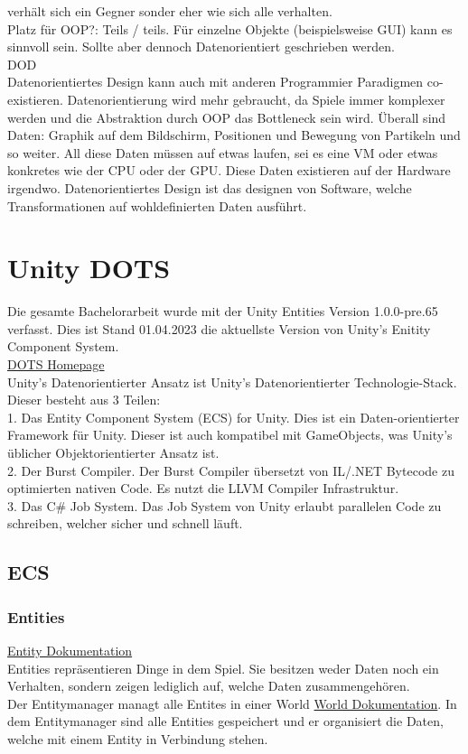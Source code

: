 \documentclass[12pt, titlepage]{article}
\begin{document}
verhält sich ein Gegner sonder eher wie sich alle verhalten.\\Platz für OOP?: Teils / teils. Für einzelne Objekte (beispielsweise GUI) kann es sinnvoll sein. Sollte aber dennoch Datenorientiert geschrieben werden.
\\ DOD \cite{DOD}\\
Datenorientiertes Design kann auch mit anderen Programmier Paradigmen co-existieren. Datenorientierung wird mehr gebraucht, da Spiele immer komplexer werden und die Abstraktion durch OOP das Bottleneck sein wird. Überall sind Daten: Graphik auf dem Bildschirm, Positionen und Bewegung von Partikeln und so weiter. All diese Daten müssen auf etwas laufen, sei es eine VM oder etwas konkretes wie der CPU oder der GPU. Diese Daten existieren auf der Hardware irgendwo. Datenorientiertes Design ist das designen von Software, welche Transformationen auf wohldefinierten Daten ausführt. 
\newpage
\section{Unity DOTS}
Die gesamte Bachelorarbeit wurde mit der Unity Entities Version 1.0.0-pre.65 verfasst. Dies ist Stand 01.04.2023 die aktuellste Version von Unity's Enitity Component System.\\
\href{https://unity.com/de/dots}{DOTS Homepage} \\
Unity's Datenorientierter Ansatz ist Unity's Datenorientierter Technologie-Stack. Dieser besteht aus 3 Teilen:\\
1. Das Entity Component System (ECS) for Unity. Dies ist ein Daten-orientierter Framework für Unity. Dieser ist auch kompatibel mit GameObjects, was Unity's üblicher Objektorientierter Ansatz ist.\\2. Der Burst Compiler. Der Burst Compiler übersetzt von IL/.NET Bytecode zu optimierten nativen Code. Es nutzt die LLVM Compiler Infrastruktur.\\3. Das C\# Job System. Das Job System von Unity erlaubt parallelen Code zu schreiben, welcher sicher und schnell läuft.
\subsection{ECS}
\subsubsection{Entities}
\href{https://docs.unity3d.com/Packages/com.unity.entities@1.0/manual/concepts-entities.html}{Entity Dokumentation}\\Entities repräsentieren Dinge in dem Spiel. Sie besitzen weder Daten noch ein Verhalten, sondern zeigen lediglich auf, welche Daten zusammengehören. \\Der Entitymanager managt alle Entites in einer World \href{https://docs.unity3d.com/Packages/com.unity.entities@0.1/manual/world.html}{World Dokumentation}. In dem Entitymanager sind alle Entities gespeichert und er organisiert die Daten, welche mit einem Entity in Verbindung stehen. 
\end{document}
